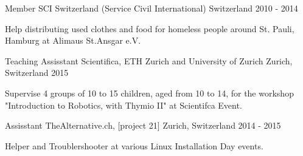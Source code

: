 

\begin{cventries}

  \cventry
    {Member} %
    {SCI Switzerland (Service Civil International)} %
    {Switzerland} %
    {2010 - 2014} %
    {
      \begin{cvitems} %
        \item {Help distributing used clothes and food for homeless people around St. Pauli, Hamburg at Alimaus St.Ansgar e.V.}
      \end{cvitems}
    }

  \cventry
    {Teaching Assisstant} %
    {Scientifica, ETH Zurich and University of Zurich} %
    {Zurich, Switzerland} %
    {2015} %
    {
      \begin{cvitems} %
        \item {Supervise 4 groups of 10 to 15 children, aged from 10 to 14, for the workshop "Introduction to Robotics, with Thymio II" at Scientifca Event.}
      \end{cvitems}
    }

  \cventry
    {Assisstant} %
    {TheAlternative.ch, [project 21]} %
    {Zurich, Switzerland} %
    {2014 - 2015} %
    {
      \begin{cvitems} %
        \item {Helper and Troublershooter at various Linux Installation Day events.}
      \end{cvitems}
    }


\end{cventries}

